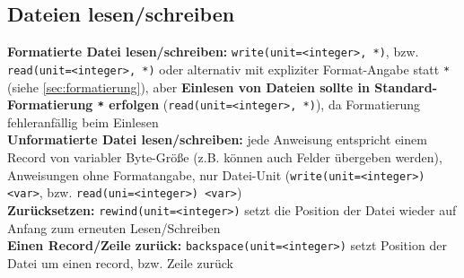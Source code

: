 \documentclass[a4paper, twocolumn]{scrarticle}
\begin{document}
\subsection{Dateien lesen/schreiben}
\textbf{Formatierte Datei lesen/schreiben:} \lstinline|write(unit=<integer>, *)|, bzw. \lstinline|read(unit=<integer>, *)| oder alternativ mit expliziter Format-Angabe statt \lstinline|*| (siehe \cref{sec:formatierung}), aber
\textbf{Einlesen von Dateien sollte in Standard-Formatierung \lstinline|*| erfolgen} (\lstinline|read(unit=<integer>, *)|), da Formatierung fehleranfällig beim Einlesen\\
\textbf{Unformatierte Datei lesen/schreiben:} jede Anweisung entspricht einem Record von variabler Byte-Größe (z.B. können auch Felder übergeben werden), Anweisungen ohne Formatangabe, nur Datei-Unit (\lstinline|write(unit=<integer>) <var>|, bzw. \lstinline|read(uni=<integer>) <var>|)\\
\textbf{Zurücksetzen:} \lstinline|rewind(unit=<integer>)| setzt die Position der Datei wieder auf Anfang zum erneuten Lesen/Schreiben\\
\textbf{Einen Record/Zeile zurück:} \lstinline|backspace(unit=<integer>)| setzt Position der Datei um einen record, bzw. Zeile zurück
\end{document}
